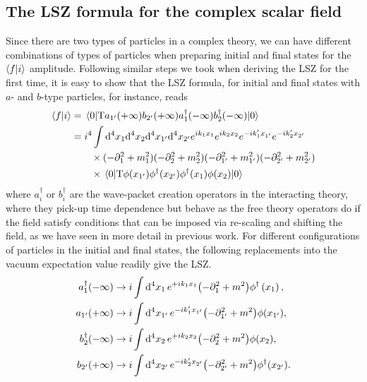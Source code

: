 \subsection{The LSZ formula for the complex scalar field}
Since there are two types of particles in a complex theory, we can have different combinations of types of particles  when preparing initial and final states for the $\braket{f}{i}$ amplitude.
Following similar steps we took when deriving the LSZ for the first time, it is easy to show that the LSZ formula, for initial and final states with $a$- and $b$-type particles, for instance, reads
\begin{equation}
\begin{aligned}
        \braket{f}{i}&=\vev{\text{T}a_{1^\prime}(+\infty)b_{2^\prime}(+\infty)a^\dagger_1(-\infty)b^\dagger_2(-\infty)}\\
        &=i^4\int \dd^4x_1\dd^4x_2\dd^4x_{1^\prime}\dd^4x_{2^\prime}e^{ik_1x_1}e^{ik_2x_2}e^{-ik_1^\prime x_{1^\prime}}e^{-ik_2^\prime x_{2^\prime}}\\
        &\qquad\times(-\partial^2_{1}+m^2_{1})(-\partial^2_{2}+m^2_{2})(-\partial^2_{1^\prime}+m^2_{1^\prime})(-\partial^2_{2^\prime}+m^2_{2^\prime})\\
        &\qquad\times\vev{\text{T}\phi(x_{1^\prime})\phi^\dagger(x_{2^\prime})\phi^\dagger(x_1)\phi(x_2)}
\end{aligned}
\end{equation}
where $a_i^\dagger$ or $b_i^\dagger$ are the wave-packet creation operators in the interacting theory, where they pick-up time dependence but behave as the free theory operators do if the field satisfy  conditions that can be imposed via re-scaling and shifting the field, as we have seen in more detail in previous work. For different configurations of particles in the initial and final states, the following replacements into the vacuum expectation value readily give the LSZ.
\begin{equation}
    \begin{aligned}
    a_{1}^{\dagger}(-\infty)& \rightarrow i \int \dd^{4} x_{1}\, e^{+i k_{1} x_{1}}\qty(-\partial_{1}^{2}+m^{2}) \phi^{\dagger}\left(x_{1}\right),\\
    a_{1^{\prime}}(+\infty)& \rightarrow i \int \dd^{4} x_{1^{\prime}}\, e^{-i k_{1}^{\prime} x_{1^{\prime}}}\qty(-\partial_{1^{\prime}}^{2}+m^{2}) \phi(x_{1^{\prime}}),\\
    b_{2}^{\dagger}(-\infty)&\rightarrow i \int\dd^{4} x_{2}\, e^{+i k_{2} x_{2}}\qty(-\partial_{2}^{2}+m^{2}) \phi(x_{2}),\\
    b_{2^{\prime}}(+\infty)&\rightarrow i \int \dd^{4} x_{2^{\prime}}\, e^{-i k_{2}^{\prime} x_{2^{\prime}}}\qty(-\partial_{2^{\prime}}^{2}+m^{2}) \phi^{\dagger}(x_{2^{\prime}}).\\
    \end{aligned}
\end{equation}
